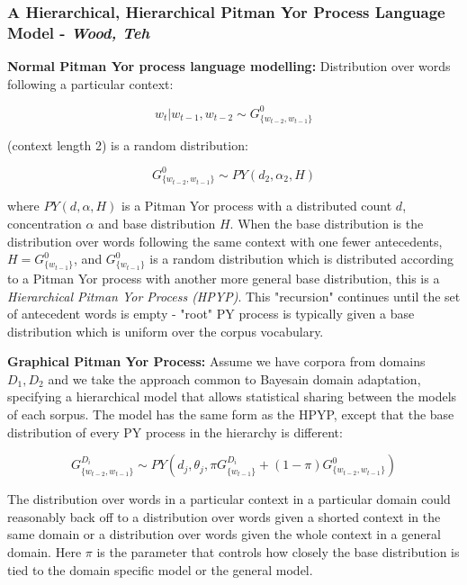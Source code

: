 \subsubsection{A Hierarchical, Hierarchical Pitman Yor Process Language Model - \textit{Wood, Teh}}

\textbf{Normal Pitman Yor process language modelling:} Distribution over words following a particular context:

\begin{equation}
w_{t}|w_{t-1}, w_{t-2} \sim G_{\{w_{t-2},w_{t-1}\}}^{0}
\label{eq:PYWordDistribution}
\end{equation}

\noindent (context length 2) is a random distribution:

\begin{equation}
G_{\{w_{t-2}, w_{t-1}\}}^{0} \sim PY(d_{2}, \alpha_{2}, H)
\label{eq:PYDistributionPY}
\end{equation}

\noindent where $PY(d, \alpha, H)$ is a Pitman Yor process with a distributed count $d$, concentration $\alpha$ and base distribution $H$. When the base distribution is the distribution over words following the same context with one fewer antecedents, $H=G_{\{w_{t-1}\}}^{0}$, and $G_{\{w_{t-1}\}}^{0}$ is a random distribution which is distributed according to a Pitman Yor process with another more general base distribution, this is a \textit{Hierarchical Pitman Yor Process (HPYP)}. This "recursion" continues until the set of antecedent words is empty - "root" PY process is typically given a base distribution which is uniform over the corpus vocabulary.

\textbf{Graphical Pitman Yor Process:} Assume we have corpora from domains $D_{1}, D_{2}$ and we take the approach common to Bayesain domain adaptation, specifying a hierarchical model that allows statistical sharing between the models of each sorpus. The model has the same form as the HPYP, except that the base distribution of every PY process in the hierarchy is different:

\begin{equation}
G_{\{w_{t-2}, w_{t-1}\}}^{D_{i}} \sim PY(d_{j}, \theta_{j}, \pi G_{\{w_{t-1}\}}^{D_{i}} + (1-\pi)G_{\{w_{t-2}, w_{t-1}\}}^{0})
\label{eq:graphicalPY}
\end{equation}

\noindent The distribution over words in a particular context in a particular domain could reasonably back off to a distribution over words given a shorted context in the same domain or a distribution over words given the whole context in a general domain. Here $\pi$ is the parameter that controls how closely the base distribution is tied to the domain specific model or the general model.

